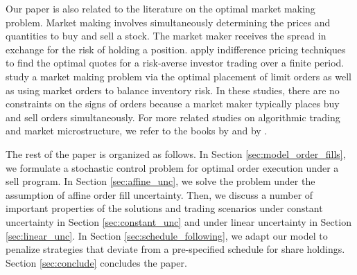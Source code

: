 \documentclass[12pt, letterpaper]{article}
\numberwithin{equation}{section}
\numberwithin{theorem}{section}
\begin{document}

 Our paper is also related to the literature on the optimal market making problem. Market making involves simultaneously determining the prices and quantities to buy and sell a stock. The market maker receives the spread in exchange for the risk of holding a position. \cite{AvellandaStoikov2008}   apply indifference pricing techniques to find the optimal quotes for a risk-averse investor trading over a finite period. \cite{GuilbaudPham2013}   study a market making problem via the optimal placement of limit orders as well as using market orders to balance inventory risk. In these studies, there are no constraints on the signs of orders because a market maker typically  places buy and sell orders simultaneously. For more related studies on algorithmic trading and market microstructure, we refer to the books by \cite{lehalleBook} and by \cite{sebBook}.
 

The rest of the paper is organized as follows. In Section \ref{sec:model_order_fills}, we formulate a stochastic control problem for     optimal order execution under a sell program. In Section \ref{sec:affine_unc}, we solve the problem under the assumption of affine order fill uncertainty. Then, we discuss a number of important properties of the solutions and trading scenarios under constant uncertainty in Section \ref{sec:constant_unc} and under linear uncertainty in Section  \ref{sec:linear_unc}. In Section \ref{sec:schedule_following}, we adapt our model to penalize strategies that deviate from a pre-specified schedule for share holdings. Section \ref{sec:conclude} concludes the paper. 
\end{document}
